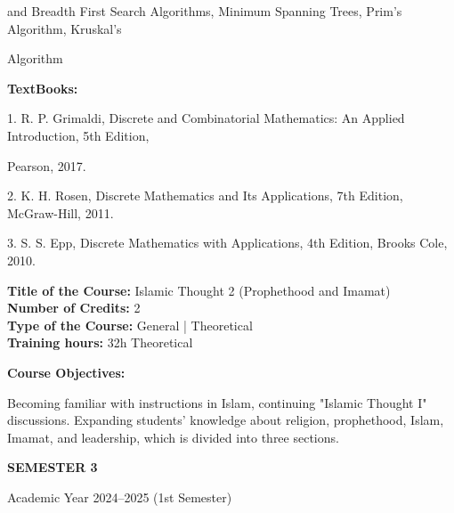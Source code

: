 \documentclass[12pt,a4paper]{article}
\begin{document}
and Breadth First Search Algorithms, Minimum Spanning Trees, Prim’s Algorithm, Kruskal’s\par
Algorithm\par\vspace{4pt}
\textbf{TextBooks:}\par\vspace{2pt}
1. R. P. Grimaldi, Discrete and Combinatorial Mathematics: An Applied Introduction, 5th Edition,\par
Pearson, 2017.\par
2. K. H. Rosen, Discrete Mathematics and Its Applications, 7th Edition, McGraw-Hill, 2011.\par
3. S. S. Epp, Discrete Mathematics with Applications, 4th Edition, Brooks Cole, 2010.\par
\vspace{4pt}

\newpage
\nopagebreak
\textbf{Title of the Course:} Islamic Thought 2 (Prophethood and Imamat)\\
\textbf{Number of Credits:} 2\\
\textbf{Type of the Course:} General | Theoretical\\
\textbf{Training hours:} 32h Theoretical\par\vspace{4pt}
\textbf{Course Objectives:}\par\vspace{2pt}
Becoming familiar with instructions in Islam, continuing "Islamic Thought I" discussions.
Expanding students' knowledge about religion, prophethood, Islam, Imamat, and leadership,
which is divided into three sections.\par\vspace{4pt}

\newpage
\vspace*{\fill}
\begin{center}
  {\fontsize{28pt}{34pt}\selectfont \textbf{SEMESTER 3}}\par\vspace{12pt}
  {\fontsize{13pt}{17pt}\selectfont Academic Year 2024–2025 (1st Semester)}
\end{center}
\vspace*{\fill}
\end{document}
